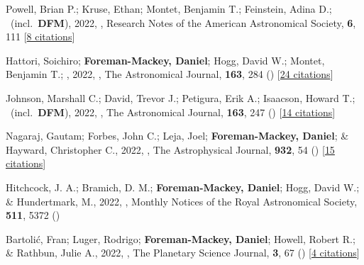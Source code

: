 \item[{\color{numcolor}\scriptsize82}] Powell, Brian P.; Kruse, Ethan; Montet, Benjamin T.; Feinstein, Adina D.; \etal\ (incl.\ \textbf{DFM}), 2022, , Research Notes of the American Astronomical Society, \textbf{6}, 111 [\href{https://ui.adsabs.harvard.edu/abs/2022RNAAS...6..111P}{8 citations}]

\item[{\color{numcolor}\scriptsize81}] Hattori, Soichiro; \textbf{Foreman-Mackey, Daniel}; Hogg, David W.; Montet, Benjamin T.; \etal, 2022, , The Astronomical Journal, \textbf{163}, 284 () [\href{https://ui.adsabs.harvard.edu/abs/2022AJ....163..284H}{24 citations}]

\item[{\color{numcolor}\scriptsize80}] Johnson, Marshall C.; David, Trevor J.; Petigura, Erik A.; Isaacson, Howard T.; \etal\ (incl.\ \textbf{DFM}), 2022, , The Astronomical Journal, \textbf{163}, 247 () [\href{https://ui.adsabs.harvard.edu/abs/2022AJ....163..247J}{14 citations}]

\item[{\color{numcolor}\scriptsize79}] Nagaraj, Gautam; Forbes, John C.; Leja, Joel; \textbf{Foreman-Mackey, Daniel}; \& Hayward, Christopher C., 2022, , The Astrophysical Journal, \textbf{932}, 54 () [\href{https://ui.adsabs.harvard.edu/abs/2022ApJ...932...54N}{15 citations}]

\item[{\color{numcolor}\scriptsize78}] Hitchcock, J. A.; Bramich, D. M.; \textbf{Foreman-Mackey, Daniel}; Hogg, David W.; \& Hundertmark, M., 2022, , Monthly Notices of the Royal Astronomical Society, \textbf{511}, 5372 ()

\item[{\color{numcolor}\scriptsize77}] Bartoli{\'c}, Fran; Luger, Rodrigo; \textbf{Foreman-Mackey, Daniel}; Howell, Robert R.; \& Rathbun, Julie A., 2022, , The Planetary Science Journal, \textbf{3}, 67 () [\href{https://ui.adsabs.harvard.edu/abs/2022PSJ.....3...67B}{4 citations}]

